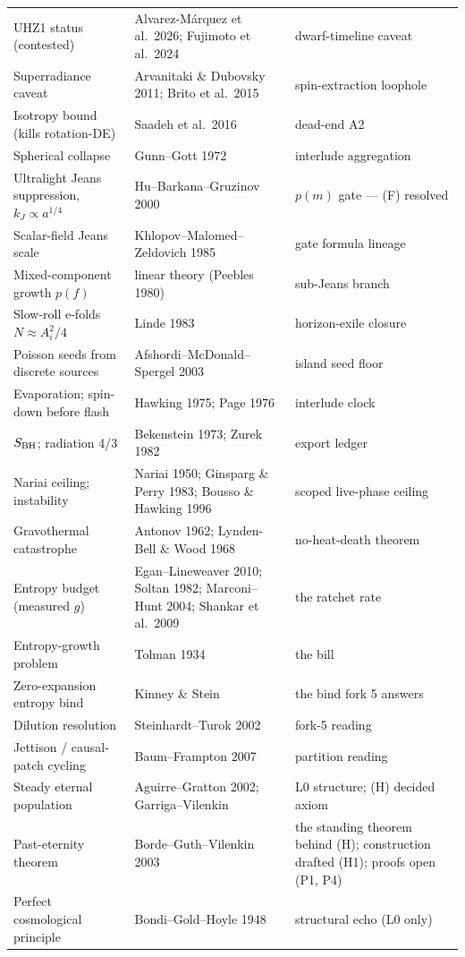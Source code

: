\documentclass[11pt]{article}
\begin{document}
\begin{small}
\begin{longtable}{p{}p{}p{}}
UHZ1 status (contested) & Alvarez-M\'arquez et al.\ 2026; Fujimoto et al.\ 2024 & dwarf-timeline caveat\\
Superradiance caveat & Arvanitaki \& Dubovsky 2011; Brito et al.\ 2015 & spin-extraction loophole\\
Isotropy bound (kills rotation-DE) & Saadeh et al.\ 2016 & dead-end A2\\
Spherical collapse & Gunn--Gott 1972 & interlude aggregation\\
Ultralight Jeans suppression, $k_J\propto a^{1/4}$ & Hu--Barkana--Gruzinov 2000 & $p(m)$ gate --- (F) resolved\\
Scalar-field Jeans scale & Khlopov--Malomed--Zeldovich 1985 & gate formula lineage\\
Mixed-component growth $p(f)$ & linear theory (Peebles 1980) & sub-Jeans branch\\
Slow-roll e-folds $N\approx A_i^2/4$ & Linde 1983 & horizon-exile closure\\
Poisson seeds from discrete sources & Afshordi--McDonald--Spergel 2003 & island seed floor\\
Evaporation; spin-down before flash & Hawking 1975; Page 1976 & interlude clock\\
$S_{\rm BH}$; radiation 4/3 & Bekenstein 1973; Zurek 1982 & export ledger\\
Nariai ceiling; instability & Nariai 1950; Ginsparg \& Perry 1983; Bousso \& Hawking 1996 & scoped live-phase ceiling\\
Gravothermal catastrophe & Antonov 1962; Lynden-Bell \& Wood 1968 & no-heat-death theorem\\
Entropy budget (measured $g$) & Egan--Lineweaver 2010; Soltan 1982; Marconi--Hunt 2004; Shankar et al.\ 2009 & the ratchet rate\\
Entropy-growth problem & Tolman 1934 & the bill\\
Zero-expansion entropy bind & Kinney \& Stein & the bind fork 5 answers\\
Dilution resolution & Steinhardt--Turok 2002 & fork-5 reading\\
Jettison / causal-patch cycling & Baum--Frampton 2007 & partition reading\\
Steady eternal population & Aguirre--Gratton 2002; Garriga--Vilenkin & L0 structure; (H) decided axiom\\
Past-eternity theorem & Borde--Guth--Vilenkin 2003 & the standing theorem behind (H); construction drafted (H1); proofs open (P1, P4)\\
Perfect cosmological principle & Bondi--Gold--Hoyle 1948 & structural echo (L0 only)\\

\end{longtable}
\end{small}
\end{document}
